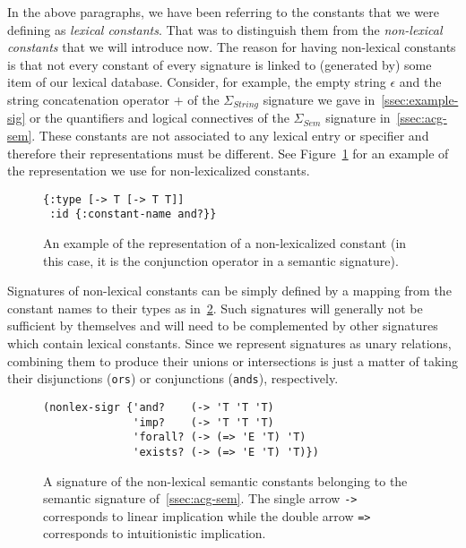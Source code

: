In the above paragraphs, we have been referring to the constants that we
were defining as \emph{lexical constants}. That was to distinguish them
from the \emph{non-lexical constants} that we will introduce now. The
reason for having non-lexical constants is that not every constant of
every signature is linked to (generated by) some item of our lexical
database. Consider, for example, the empty string $\epsilon$ and the
string concatenation operator $+$ of the $\Sigma_{String}$ signature we
gave in~\ref{ssec:example-sig} or the quantifiers and logical
connectives of the $\Sigma_{Sem}$ signature in~\ref{ssec:acg-sem}.
These constants are not associated to any lexical entry or specifier and
therefore their representations must be different. See
Figure~\ref{fig:nonlex-const} for an example of the representation we
use for non-lexicalized constants.

\begin{figure}
  \centering
\begin{verbatim}
{:type [-> T [-> T T]]
 :id {:constant-name and?}}
\end{verbatim}
  \caption{\label{fig:nonlex-const} An example of the representation of
    a non-lexicalized constant (in this case, it is the conjunction
    operator in a semantic signature).}
\end{figure}

Signatures of non-lexical constants can be simply defined by a mapping
from the constant names to their types as
in~\ref{fig:nonlex-sig-impl}. Such signatures will generally not be
sufficient by themselves and will need to be complemented by other
signatures which contain lexical constants. Since we represent
signatures as unary relations, combining them to produce their unions or
intersections is just a matter of taking their disjunctions
(\texttt{ors}) or conjunctions (\texttt{ands}), respectively.

\begin{figure}
  \centering
\begin{verbatim}
(nonlex-sigr {'and?    (-> 'T 'T 'T)
              'imp?    (-> 'T 'T 'T)
              'forall? (-> (=> 'E 'T) 'T)
              'exists? (-> (=> 'E 'T) 'T)})
\end{verbatim}
  \caption{\label{fig:nonlex-sig-impl} A signature of the non-lexical
    semantic constants belonging to the semantic signature
    of~\ref{ssec:acg-sem}. The single arrow \texttt{->} corresponds to
    linear implication while the double arrow \texttt{=>} corresponds to
    intuitionistic implication.}
\end{figure}

